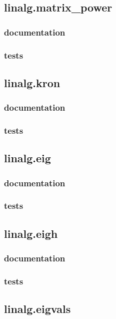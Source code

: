 \documentclass[a4paper,11pt]{article}
\begin{document}
\subsection{linalg.matrix\_power}

\subsubsection{documentation}
\subsubsection{tests}
\subsection{linalg.kron}

\subsubsection{documentation}
\subsubsection{tests}
\subsection{linalg.eig}

\subsubsection{documentation}
\subsubsection{tests}
\subsection{linalg.eigh}

\subsubsection{documentation}
\subsubsection{tests}
\subsection{linalg.eigvals}
\end{document}
